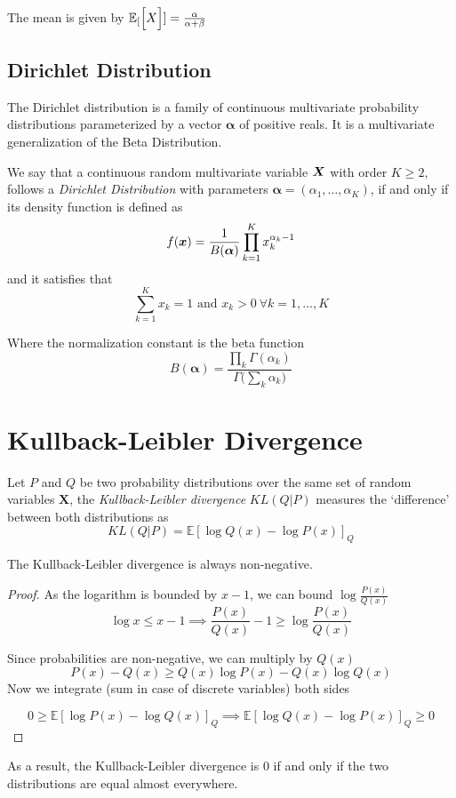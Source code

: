 The mean is given by \(\mathbb{E}_{[}\Big[X\Big]] = \frac{\alpha}{\alpha + \beta}\)

\subsection{Dirichlet Distribution}

The Dirichlet distribution is a family of continuous multivariate probability
distributions parameterized by a vector \(\bm{\alpha}\) of positive reals. It is
a multivariate generalization of the Beta Distribution.

\begin{definition}
  We say that a continuous random multivariate variable \(\bm{X}\) with order
  \(K \geq 2\), follows a \emph{Dirichlet
    Distribution} with parameters \(\bm{\alpha} = (\alpha_{1}, \dots, \alpha_{K})\), if and
  only if its density function is defined as
  \[
    f(\bm{x}) = \frac{1}{B(\bm{\alpha})}\prod_{k = 1}^{K}x_{k}^{\alpha_{k}-1}
  \]
  and it satisfies that
  \[
    \sum_{k=1}^{K} x_{k} = 1 \text{ and } x_{k} > 0 \ \forall k=1,\dots,K
  \]
\end{definition}

Where the normalization constant is the beta function
\[
  B(\bm{\alpha}) = \frac{\prod_{k} \Gamma (\alpha_{k})}{\Gamma \big( \sum_{k}\alpha_{k} \big)}
\]



\section{Kullback-Leibler Divergence}

\begin{definition}
  Let \(P\) and \(Q\) be two probability distributions over the same set of
  random variables \(\bm{X}\), the \emph{Kullback-Leibler divergence}
  \(KL(Q|P)\) measures the `difference' between both distributions as
  \[
    KL(Q|P) = \mathbb{E}[\log Q(x) - \log P(x)]_Q
  \]
\end{definition}

\begin{proposition}
The Kullback-Leibler divergence is always non-negative.
\end{proposition}
\begin{proof}
  As the logarithm is bounded by \(x - 1\), we can bound \(\log{\frac{P(x)}{Q(x)}}\)
  \[
    \log{x} \leq x - 1 \implies \frac{P(x)}{Q(x)} - 1 \geq \log{\frac{P(x)}{Q(x)}}
  \]

  Since probabilities are non-negative, we can multiply by \(Q(x)\)
  \[
    P(x) - Q(x) \geq Q(x) \log{P(x)} - Q(x) \log{Q(x)}
  \]
  Now we integrate (sum in case of discrete variables) both sides

  \[
    0 \geq \mathbb{E}[\log{P(x)} - \log{Q(x)}]_Q \implies \mathbb{E}[\log{Q(x)}
    - \log{P(x)}]_Q \geq 0
  \]
\end{proof}
As a result, the Kullback-Leibler divergence is \(0\) if and only if the two
distributions are equal almost everywhere.

